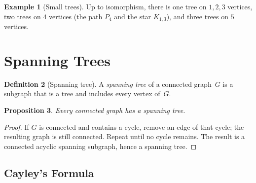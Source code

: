 \documentclass[12pt,a4paper,openany]{book}
\theoremstyle{definition}
\newtheorem{definition}{Definition}[chapter]
\newtheorem{example}[definition]{Example}
\theoremstyle{plain}
\newtheorem{proposition}[definition]{Proposition}
\theoremstyle{remark}
\begin{document}
\begin{example}[Small trees]
\label{ex:small-trees}
Up to isomorphism, there is one tree on $1,2,3$ vertices, two trees on
$4$ vertices (the path $P_4$ and the star $K_{1,3}$), and three trees
on $5$ vertices.

\begin{center}
\end{center}
\end{example}

\section{Spanning Trees}
\label{sec:spanning-tree}

\begin{definition}[Spanning tree]
\label{def:spanning-tree}
A \emph{spanning tree} of a connected graph~$G$ is a subgraph that is
a tree and includes every vertex of~$G$.
\end{definition}

\begin{proposition}
\label{prop:spanning-exists}
Every connected graph has a spanning tree.
\end{proposition}

\begin{proof}
If $G$ is connected and contains a cycle, remove an edge of that cycle;
the resulting graph is still connected.  Repeat until no cycle remains.
The result is a connected acyclic spanning subgraph, hence a spanning tree.
\end{proof}

\subsection{Cayley's Formula}
\label{ssec:cayley}
\end{document}
